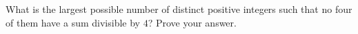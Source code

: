 What is the largest possible number of distinct positive integers such that no four of them have a sum divisible by $4$? Prove your answer.
